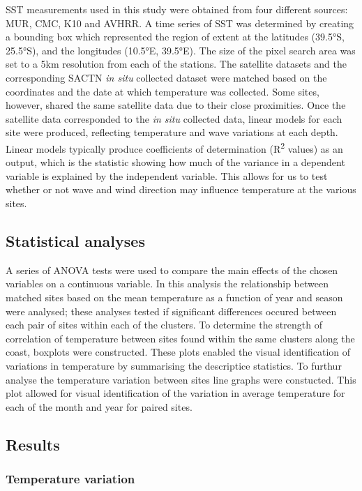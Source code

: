 \documentclass[12pt,A4paper,]{article}
\begin{document}
SST measurements used in this study were obtained from four different
sources: MUR, CMC, K10 and AVHRR. A time series of SST was determined by
creating a bounding box which represented the region of extent at the
latitudes (39.5°S, 25.5°S), and the longitudes (10.5°E, 39.5°E). The
size of the pixel search area was set to a 5km resolution from each of
the stations. The satellite datasets and the corresponding SACTN
\emph{in situ} collected dataset were matched based on the coordinates
and the date at which temperature was collected. Some sites, however,
shared the same satellite data due to their close proximities. Once the
satellite data corresponded to the \emph{in situ} collected data, linear
models for each site were produced, reflecting temperature and wave
variations at each depth. Linear models typically produce coefficients
of determination (R\textsuperscript{2} values) as an output, which is
the statistic showing how much of the variance in a dependent variable
is explained by the independent variable. This allows for us to test
whether or not wave and wind direction may influence temperature at the
various sites.

\subsection{Statistical analyses}\label{statistical-analyses}

A series of ANOVA tests were used to compare the main effects of the
chosen variables on a continuous variable. In this analysis the
relationship between matched sites based on the mean temperature as a
function of year and season were analysed; these analyses tested if
significant differences occured between each pair of sites within each
of the clusters. To determine the strength of correlation of temperature
between sites found within the same clusters along the coast, boxplots
were constructed. These plots enabled the visual identification of
variations in temperature by summarising the descriptice statistics. To
furthur analyse the temperature variation between sites line graphs were
constucted. This plot allowed for visual identification of the variation
in average temperature for each of the month and year for paired sites.

\subsection{Results}\label{results}

\subsubsection{Temperature variation}\label{temperature-variation}
\end{document}

